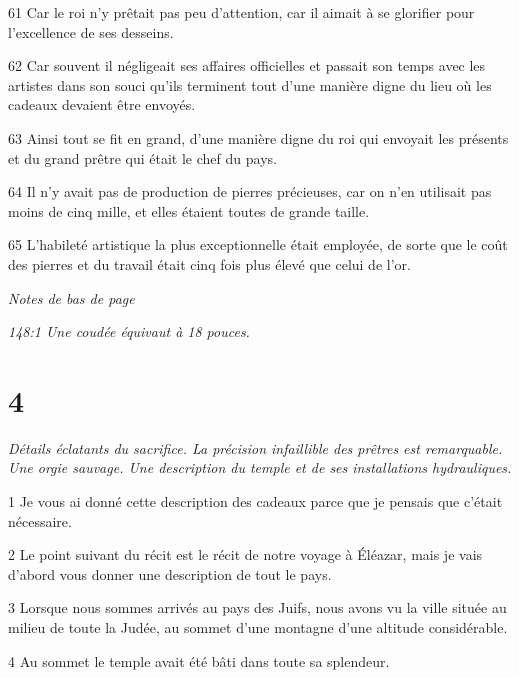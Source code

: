 \par 61 Car le roi n'y prêtait pas peu d'attention, car il aimait à se glorifier pour l'excellence de ses desseins.

\par 62 Car souvent il négligeait ses affaires officielles et passait son temps avec les artistes dans son souci qu'ils terminent tout d'une manière digne du lieu où les cadeaux devaient être envoyés.

\par 63 Ainsi tout se fit en grand, d'une manière digne du roi qui envoyait les présents et du grand prêtre qui était le chef du pays.

\par 64 Il n'y avait pas de production de pierres précieuses, car on n'en utilisait pas moins de cinq mille, et elles étaient toutes de grande taille.

\par 65 L'habileté artistique la plus exceptionnelle était employée, de sorte que le coût des pierres et du travail était cinq fois plus élevé que celui de l'or.

\par \textit{Notes de bas de page}

\par \textit{148:1 Une coudée équivaut à 18 pouces.}

\chapter{4}

\par \textit{Détails éclatants du sacrifice. La précision infaillible des prêtres est remarquable. Une orgie sauvage. Une description du temple et de ses installations hydrauliques.}

\par 1 Je vous ai donné cette description des cadeaux parce que je pensais que c'était nécessaire.

\par 2 Le point suivant du récit est le récit de notre voyage à Éléazar, mais je vais d'abord vous donner une description de tout le pays.

\par 3 Lorsque nous sommes arrivés au pays des Juifs, nous avons vu la ville située au milieu de toute la Judée, au sommet d'une montagne d'une altitude considérable.

\par 4 Au sommet le temple avait été bâti dans toute sa splendeur.

